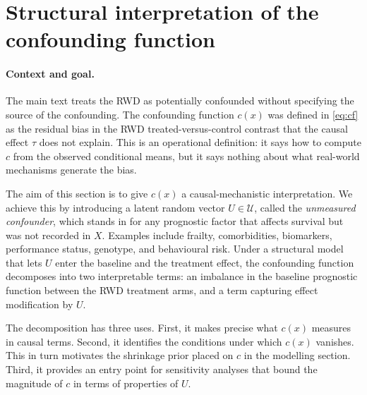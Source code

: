 
\section{Structural interpretation of the confounding function}\label{sm:scm}

\paragraph{Context and goal.}
The main text treats the RWD as potentially confounded without specifying the source of the confounding.
The confounding function $c(x)$ was defined in \eqref{eq:cf} as the residual bias in the RWD treated-versus-control contrast that the causal effect $\tau$ does not explain.
This is an operational definition: it says how to compute $c$ from the observed conditional means, but it says nothing about what real-world mechanisms generate the bias.

The aim of this section is to give $c(x)$ a causal-mechanistic interpretation.
We achieve this by introducing a latent random vector $U \in \mathcal{U}$, called the \emph{unmeasured confounder}, which stands in for any prognostic factor that affects survival but was not recorded in $X$.
Examples include frailty, comorbidities, biomarkers, performance status, genotype, and behavioural risk.
Under a structural model that lets $U$ enter the baseline and the treatment effect, the confounding function decomposes into two interpretable terms: an imbalance in the baseline prognostic function between the RWD treatment arms, and a term capturing effect modification by $U$.

The decomposition has three uses.
First, it makes precise what $c(x)$ measures in causal terms.
Second, it identifies the conditions under which $c(x)$ vanishes.
This in turn motivates the shrinkage prior placed on $c$ in the modelling section.
Third, it provides an entry point for sensitivity analyses that bound the magnitude of $c$ in terms of properties of $U$.

